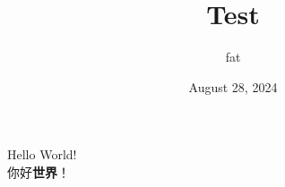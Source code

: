 \documentclass{article}
\title{Test}
\author{fat}
\date{August 28, 2024}
\begin{document}
\maketitle
\thispagestyle{fancy}
\renewcommand{\footrulewidth}{0.4pt}
\cfoot{\thepage}
\renewcommand{\headrulewidth}{0.4pt}

\noindent Hello World! \\
你好\textbf{世界}！ \\
\end{document}
